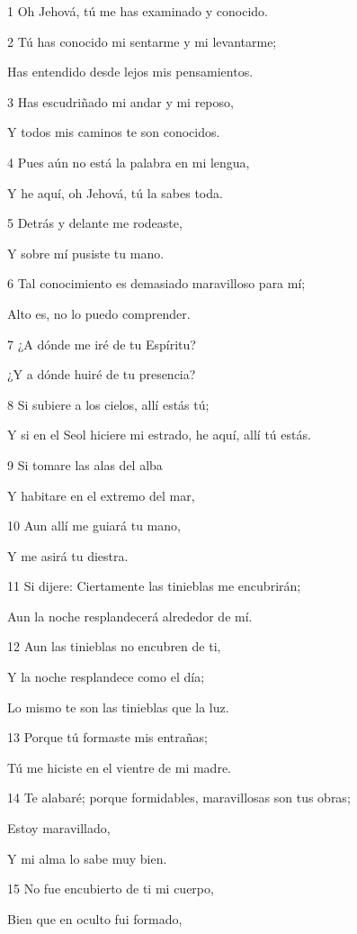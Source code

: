 \par 1 Oh Jehová, tú me has examinado y conocido.
\par 2 Tú has conocido mi sentarme y mi levantarme;
\par Has entendido desde lejos mis pensamientos.
\par 3 Has escudriñado mi andar y mi reposo,
\par Y todos mis caminos te son conocidos.
\par 4 Pues aún no está la palabra en mi lengua,
\par Y he aquí, oh Jehová, tú la sabes toda.
\par 5 Detrás y delante me rodeaste,
\par Y sobre mí pusiste tu mano.
\par 6 Tal conocimiento es demasiado maravilloso para mí;
\par Alto es, no lo puedo comprender.
\par 7 ¿A dónde me iré de tu Espíritu?
\par ¿Y a dónde huiré de tu presencia?
\par 8 Si subiere a los cielos, allí estás tú;
\par Y si en el Seol hiciere mi estrado, he aquí, allí tú estás.
\par 9 Si tomare las alas del alba
\par Y habitare en el extremo del mar,
\par 10 Aun allí me guiará tu mano,
\par Y me asirá tu diestra.
\par 11 Si dijere: Ciertamente las tinieblas me encubrirán;
\par Aun la noche resplandecerá alrededor de mí.
\par 12 Aun las tinieblas no encubren de ti,
\par Y la noche resplandece como el día;
\par Lo mismo te son las tinieblas que la luz.
\par 13 Porque tú formaste mis entrañas;
\par Tú me hiciste en el vientre de mi madre.
\par 14 Te alabaré; porque formidables, maravillosas son tus obras;
\par Estoy maravillado,
\par Y mi alma lo sabe muy bien.
\par 15 No fue encubierto de ti mi cuerpo,
\par Bien que en oculto fui formado,
